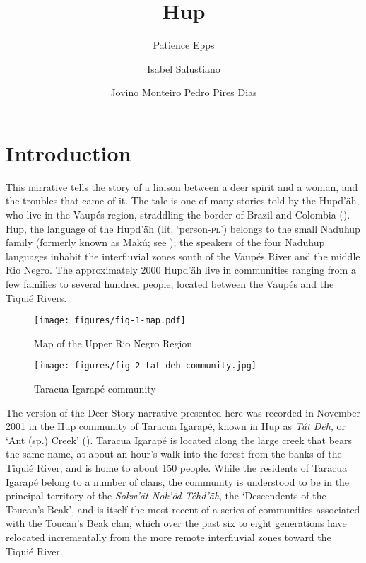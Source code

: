 \documentclass[output=paper,
modfonts,nonflat
]{langsci/langscibook}
\author{Patience Epps\affiliation{University of Texas Austin, USA}%
\and Isabel Salustiano%
\and Jovino Monteiro%
\lastand Pedro Pires Dias%
}
\title{Hup}
\begin{document}
\section{Introduction} 

This narrative tells the story of a liaison between a deer spirit and a woman, and the troubles that came of it. The tale is one of many stories told by the Hupd’äh, who live in the Vaupés region, straddling the border of Brazil and Colombia (). Hup, the language of the Hupd’äh (lit. ‘person-\textsc{pl}’) belongs to the small Naduhup family (formerly known as Makú; see \citealt{EppsandBolaños2017}); the speakers of the four Naduhup languages inhabit the interfluvial zones south of the Vaupés River and the middle Rio Negro. The approximately 2000 Hupd’äh live in communities ranging from a few families to several hundred people, located between the Vaupés and the Tiquié Rivers.
	
\begin{figure}[p]
  \texttt{[image: figures/fig-1-map.pdf]}
  \caption{Map of the Upper Rio Negro Region \citep{EppsStenz2013}}
\label{fig:hup:1}
\end{figure}
    \begin{figure}[p]
 \texttt{[image: figures/fig-2-tat-deh-community.jpg]}
  \caption{Taracua Igarapé community}
\label{fig:hup:2}
\end{figure}

    The version of the Deer Story narrative presented here was recorded in November 2001 in the Hup community of Taracua Igarapé, known in Hup as \textit{Tát Dëh}, or ‘Ant (sp.) Creek’ (). Taracua Igarapé is located along the large creek that bears the same name, at about an hour’s walk into the forest from the banks of the Tiquié River, and is home to about 150 people. While the residents of Taracua Igarapé belong to a number of clans, the community is understood to be in the principal territory of the \textit{Sokw’ät Nok’öd Tẽ́hd’äh}, the ‘Descendents of the Toucan’s Beak’, and is itself the most recent of a series of communities associated with the Toucan’s Beak clan, which over the past six to eight generations have relocated incrementally from the more remote interfluvial zones toward the Tiquié River. 
    
\end{document}
